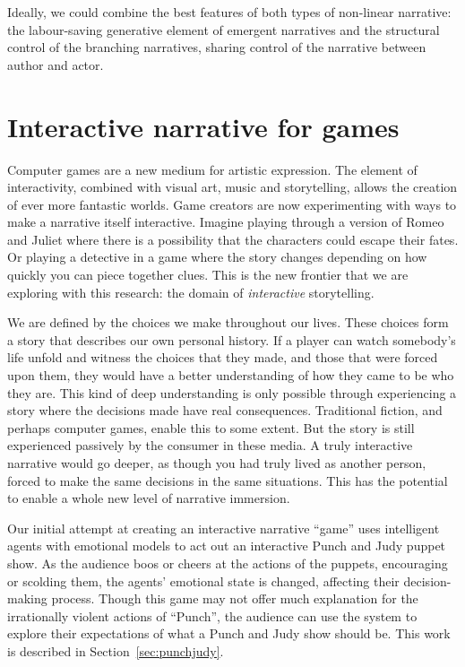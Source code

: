 \documentclass[11pt]{report}
\begin{document}
Ideally, we could combine the best features of both types of non-linear
narrative: the labour-saving generative element of emergent narratives and the
structural control of the branching narratives, sharing control of the narrative
between author and actor.

\section{Interactive narrative for games}
Computer games are a new medium for artistic expression. The element of
interactivity, combined with visual art, music and storytelling, allows the
creation of ever more fantastic worlds. Game creators are now experimenting with
ways to make a narrative itself interactive. Imagine playing through a version
of Romeo and Juliet where there is a possibility that the characters could
escape their fates. Or playing a detective in a game where the story changes
depending on how quickly you can piece together clues. This is the new frontier that we are exploring with this research: the domain of \emph{interactive} storytelling.

We are defined by the choices we make throughout our lives. These choices form a
story that describes our own personal history. If a player can watch somebody's
life unfold and witness the choices that they made, and those that were forced
upon them, they would have a better understanding of how they came to be who they
are. This kind of deep understanding is only possible through experiencing a
story where the decisions made have real consequences. Traditional fiction, and
perhaps computer games, enable this to some extent. But the story is still
experienced passively by the consumer in these media. A truly interactive
narrative would go deeper, as though you had truly lived as another person,
forced to make the same decisions in the same situations. This has the potential
to enable a whole new level of narrative immersion.

Our initial attempt at creating an interactive narrative ``game'' uses
intelligent agents with emotional models to act out an interactive Punch and
Judy puppet show. As the audience boos or cheers at the actions of the puppets,
encouraging or scolding them, the agents' emotional state is changed, affecting
their decision-making process. Though this game may not offer much explanation
for the irrationally violent actions of ``Punch'', the audience can use the
system to explore
their expectations of what a Punch and Judy show should be. This work is
described in Section~\ref{sec:punchjudy}.
\end{document}
